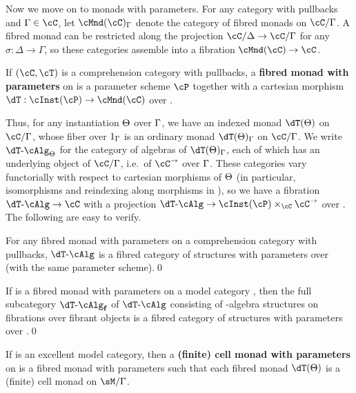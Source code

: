 \documentclass[referee]{psp}
\let\P\cP
\def\alg{\text{-}\cAlg}
\def\algf{\alg_{\mathbf{f}}}
\let\C\cC
\let\T\cT
\begin{document}
Now we move on to monads with parameters.
For any category \C with pullbacks and $\Gamma\in\C$, let $\cMnd(\C)_\Gamma$ denote the category of fibred monads on $\C/\Gamma$.
A fibred monad can be restricted along the projection $\C/\Delta\to\C/\Gamma$ for any $\sigma:\Delta\to\Gamma$, so these categories assemble into a fibration $\cMnd(\C) \to \C$.

\begin{defn}
  If $(\C,\T)$ is a comprehension category with pullbacks, a \textbf{fibred monad with parameters} on \C is a parameter scheme $\P$ together with a cartesian morphism $\dT:\cInst(\P) \to \cMnd(\C)$ over \C.
\end{defn}

Thus, for any instantiation $\Theta$ over $\Gamma$, we have an indexed monad $\dT(\Th)$ on $\C/\Gm$, whose fiber over $1_\Gamma$ is an ordinary monad $\dT(\Th)_\Gm$ on $\C/\Gm$.
We write $\dT\alg_{\Th}$ for the category of algebras of $\dT(\Th)_\Gm$, each of which has an underlying object of $\C/\Gamma$, i.e.\ of $\C^\to$ over $\Gamma$.
These categories vary functorially with respect to cartesian morphisms of $\Theta$ (in particular, isomorphisms and reindexing along morphisms in \C), so we have a fibration $\dT\alg \to \C$ with a projection $\dT\alg \to \cInst(\P)\times_\C \C^\to$ over \C.
The following are easy to verify.

\begin{lem}
  For any fibred monad with parameters \dT on a comprehension category \C with pullbacks, $\dT\alg$ is a fibred category of structures with parameters over \C (with the same parameter scheme).\qed
\end{lem}

\begin{lem}
  If \dT is a fibred monad with parameters on a model category \sM, then the full subcategory $\dT\algf$ of $\dT\alg$ consisting of \dT-algebra structures on fibrations over fibrant objects is a fibred category of structures with parameters over \Mf.\qed
\end{lem}

\begin{defn}\label{defn:cell-param}
  If \sM is an excellent model category, then a \textbf{(finite) cell monad with parameters} on \sM is a fibred monad with parameters such that each fibred monad $\dT(\Th)$ is a (finite) cell monad on $\sM/\Gamma$.
\end{defn}
\end{document}
